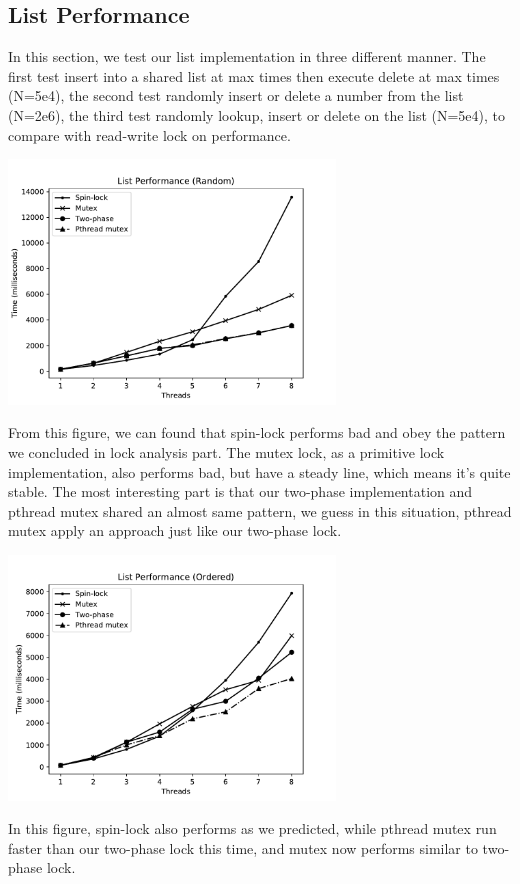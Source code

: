 \documentclass{article}
\begin{document}
\subsection{List Performance}
In this section, we test our list implementation in three different manner. The first test insert into a shared list at max times then execute delete at max times (N=5e4), the second test randomly insert or delete a number from the list (N=2e6), the third test randomly lookup, insert or delete on the list (N=5e4), to compare with read-write lock on performance.
\begin{center}
\includegraphics[width=0.65\textwidth]{OSLAB4_LIST1.pdf}
\end{center}
From this figure, we can found that spin-lock performs bad and obey the pattern we concluded in lock analysis part. The mutex lock, as a primitive lock implementation, also performs bad, but have a steady line, which means it's quite stable. The most interesting part is that our two-phase implementation and pthread mutex shared an almost same pattern, we guess in this situation, pthread mutex apply an approach just like our two-phase lock.
\begin{center}
\includegraphics[width=0.65\textwidth]{OSLAB4_LIST2.pdf}
\end{center}
In this figure, spin-lock also performs as we predicted, while pthread mutex run faster than our two-phase lock this time, and mutex now performs similar to two-phase lock.
\end{document}
